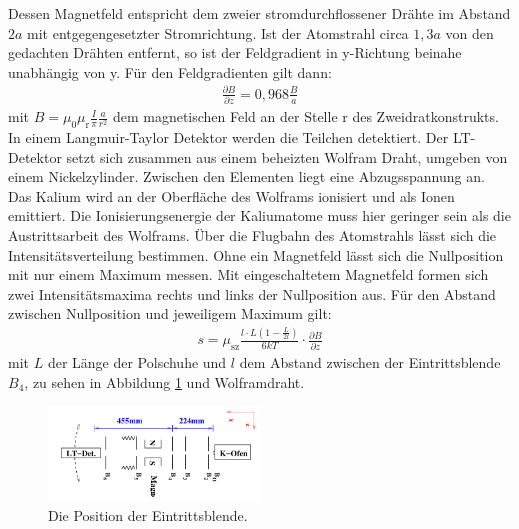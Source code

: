 Dessen Magnetfeld entspricht dem zweier stromdurchflossener Drähte im Abstand $2a$
mit entgegengesetzter Stromrichtung.
Ist der Atomstrahl circa $1,3a$ von den gedachten Drähten entfernt, so ist
der Feldgradient in y-Richtung beinahe unabhängig von y.
Für den Feldgradienten gilt dann:
\begin{align}
  \frac{\partial B}{\partial z}=0,968\frac{B}{a}\label{eqn:grad}
\end{align}
mit $B=\mu_\mathrm{0}\mu_\mathrm{r}\frac{I}{\pi}\frac{a}{r^2}$ dem magnetischen
Feld an der Stelle r des Zweidratkonstrukts.
In einem Langmuir-Taylor Detektor werden die Teilchen detektiert.
Der LT-Detektor setzt sich zusammen aus einem beheizten Wolfram Draht, umgeben
von einem Nickelzylinder. Zwischen den Elementen liegt eine Abzugsspannung an.
Das Kalium wird an der Oberfläche des Wolframs
ionisiert und als Ionen emittiert. Die Ionisierungsenergie der Kaliumatome
muss hier geringer sein als die Austrittsarbeit des Wolframs.
Über die Flugbahn des Atomstrahls lässt sich die Intensitätsverteilung
bestimmen. Ohne ein Magnetfeld lässt sich die Nullposition mit nur einem
Maximum messen. Mit eingeschaltetem Magnetfeld formen sich zwei Intensitätsmaxima
rechts und links der Nullposition aus.
Für den Abstand zwischen Nullposition und jeweiligem Maximum gilt:
\begin{align}
 s=\mu_\mathrm{sz}\frac{l\cdot L\left(1-\frac{L}{2l}\right)}{6kT}\cdot\frac{\partial B}{\partial z} \label{eqn:abstand}
\end{align}
mit $L$ der Länge der Polschuhe und $l$ dem Abstand zwischen
der Eintrittsblende $B_\mathrm{4}$, zu sehen in Abbildung \ref{fig:schema} und Wolframdraht.
\begin{figure}
   \centering
    \includegraphics[width=0.5\textwidth]{schema.PNG}
    \caption{Die Position der Eintrittsblende.\cite{skript}}
    \label{fig:schema}
    \FloatBarrier
\end{figure}
